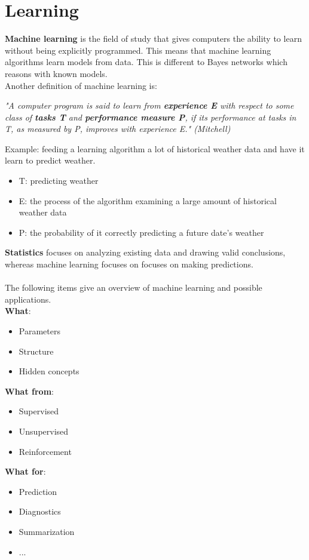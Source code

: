 \documentclass{report}
\begin{document}
\chapter{Learning}

{\bf Machine learning} is the field of study that gives computers the ability to learn without being explicitly programmed.
This means that machine learning algorithms learn models from data.
This is different to Bayes networks which reasons with known models.
\\
Another definition of machine learning is:
\begin{flushright}
{\em "A computer program is said to learn from {\bf experience E} with respect to some class of {\bf tasks T} and {\bf performance measure P}, if its performance at tasks in T, as measured by P, improves with experience E." (Mitchell)}
\end{flushright}

Example: feeding a learning algorithm a lot of historical weather data and have it learn to predict weather.
\begin{itemize}
\item T: predicting weather
\item E: the process of the algorithm examining a large amount of historical weather data
\item P: the probability of it correctly predicting a future date's weather
\end{itemize}


{\bf Statistics} focuses on analyzing existing data and drawing valid conclusions, whereas machine learning focuses on focuses on making predictions.
\\
\\
The following items give an overview of machine learning and possible applications.
\\
{\bf What}:
\begin{itemize}
  \item Parameters
  \item Structure
  \item Hidden concepts
\end{itemize}

{\bf What from}:
\begin{itemize}
  \item Supervised
  \item Unsupervised
  \item Reinforcement
\end{itemize}

{\bf What for}:
\begin{itemize}
  \item Prediction
  \item Diagnostics
  \item Summarization
  \item ...
\end{itemize}
\end{document}
